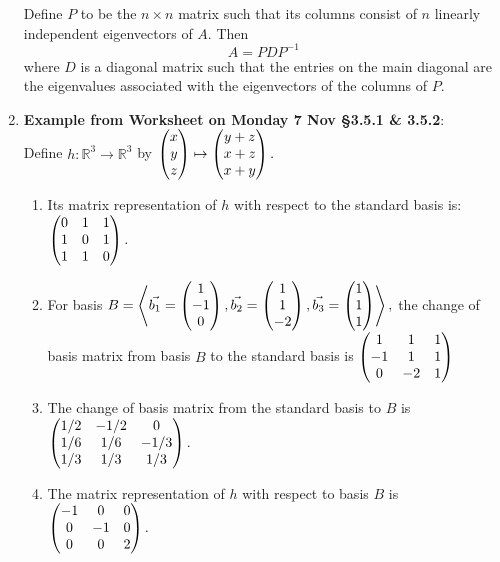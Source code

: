 \documentclass[11pt,fleqn]{article}
\begin{document}
\begin{enumerate}
 Define $P$ to be the $n \times n$ matrix such that its columns consist of $n$ linearly independent eigenvectors of $A.$ Then $$A=PDP^{-1}$$ where $D$ is a diagonal matrix such that the entries on the main diagonal are the eigenvalues associated with the eigenvectors of the columns of $P.$\\
 
 \item \textbf{Example from Worksheet on Monday 7 Nov \S 3.5.1 \& 3.5.2}: \\Define $h:\mathbb{R}^3 \to \mathbb{R}^3$ by $\begin{pmatrix} x\\y\\z \end{pmatrix} \mapsto \begin{pmatrix} y+z \\ x+z \\ x+y \end{pmatrix}.$
 
 \begin{enumerate} 
 \item Its matrix representation of $h$ with respect to the standard basis is: $\begin{pmatrix} 0&1&1\\1&0&1\\1&1&0\end{pmatrix}.$
 
 \item For basis $B=\left\langle \vec{b_1}=\begin{pmatrix} 1\\-1\\0\end{pmatrix}, \vec{b_2}=\begin{pmatrix}1\\1\\-2 \end{pmatrix}, \vec{b_3}=\begin{pmatrix} 1\\1\\1\end{pmatrix} \right\rangle,$ the change of basis matrix from basis $B$ to the standard basis is $\begin{pmatrix} 1&1&1\\-1&1&1\\0&-2&1\end{pmatrix}$
 
 \item The change of basis matrix from the standard basis to $B$ is $\begin{pmatrix} 1/2 & -1/2&0\\1/6&1/6&-1/3\\1/3&1/3&1/3\end{pmatrix}.$
 
 \item The matrix representation of $h$ with respect to basis $B$ is $\begin{pmatrix} -1&0&0\\0&-1&0\\0&0&2\end{pmatrix}.$
 

\end{enumerate}
\end{enumerate}
\end{document}
